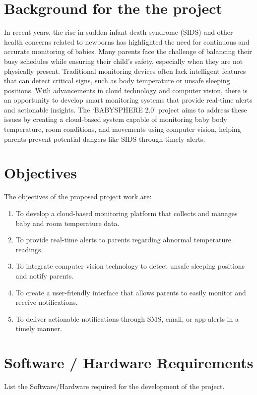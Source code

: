 \documentclass[12pt,a4paper]{report}
\begin{document}
\section*{Background for the  the project}
In recent years, the rise in sudden infant death syndrome (SIDS)
 and other health concerns related to newborns has highlighted 
 the need for continuous and accurate monitoring of babies. 
 Many parents face the challenge of balancing their busy 
 schedules while ensuring their child’s safety, especially when 
 they are not physically present. Traditional monitoring devices
  often lack intelligent features that can detect critical signs,
   such as body temperature or unsafe sleeping positions. With 
   advancements in cloud technology and computer vision, there 
   is an opportunity to develop smart monitoring systems that 
   provide real-time alerts and actionable insights. The 
   `BABYSPHERE 2.0' project aims to address these issues by 
   creating a cloud-based system capable of monitoring baby 
   body temperature, room conditions, and movements using 
   computer vision, helping parents prevent potential dangers 
   like SIDS through timely alerts.

\section*{Objectives }
The objectives of the proposed project work are:
\begin{enumerate}
    \item To develop a cloud-based monitoring platform that collects and manages baby and room temperature data.
    \item To provide real-time alerts to parents regarding abnormal temperature readings.
    \item To integrate computer vision technology to detect unsafe sleeping positions and notify parents.
    \item To create a user-friendly interface that allows parents to easily monitor and receive notifications.
    \item To deliver actionable notifications through SMS, email, or app alerts in a timely manner.
\end{enumerate}


\section*{Software / Hardware Requirements}
List the Software/Hardware required for the development of the project. 
\end{document}
